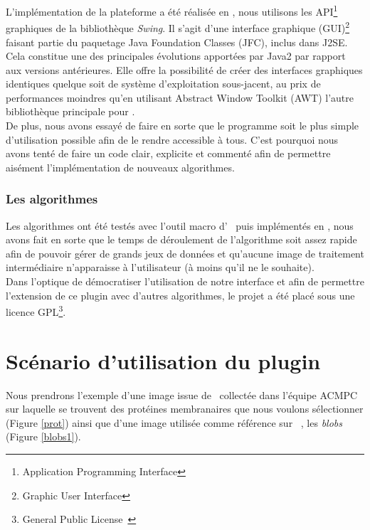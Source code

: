 \noindent
L'implémentation de la plateforme a été réalisée en \java, nous utilisons les API\footnote{Application Programming Interface} graphiques de la bibliothèque \emph{Swing}. 
Il s'agit d'une interface graphique (GUI)\footnote{Graphic User Interface} faisant partie du paquetage Java Foundation Classes (JFC), inclus dans J2SE. Cela constitue une des principales évolutions apportées par Java2 par rapport aux versions antérieures. Elle offre la possibilité de créer des interfaces graphiques identiques quelque soit de système d'exploitation sous-jacent, au prix de performances moindres qu'en utilisant Abstract Window Toolkit (AWT) l'autre bibliothèque principale pour \java. \\
De plus, nous avons essayé de faire en sorte que le programme soit le plus simple d'utilisation possible afin de le rendre accessible à tous. C'est pourquoi nous avons tenté de faire un code clair, explicite et commenté afin de permettre aisément l'implémentation de nouveaux algorithmes.

\subsubsection{Les algorithmes}

\noindent
Les algorithmes ont été testés avec l'outil macro d' \imj ~puis implémentés en \java, nous avons fait en sorte que le temps de déroulement de l'algorithme soit assez rapide afin de pouvoir gérer de grands jeux de données et qu'aucune image de traitement intermédiaire n'apparaisse à l'utilisateur (à moins qu'il ne le souhaite).\\

Dans l'optique de démocratiser l'utilisation de notre interface et afin de permettre l'extension de ce plugin avec d'autres algorithmes, le projet a été placé sous une licence GPL\footnote{General Public License~\cite{GPL:url}}.

\noindent

\section{Scénario d'utilisation du plugin}

Nous prendrons l'exemple d'une image issue de \me ~collectée dans l'équipe ACMPC sur laquelle se trouvent des protéines membranaires que nous voulons sélectionner (Figure \ref{prot}) ainsi que d'une image utilisée comme référence sur \imj ~, les \emph{blobs} (Figure \ref{blobs1}).

